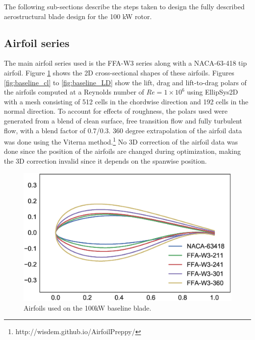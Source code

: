 The following sub-sections describe the steps taken to design the fully described aerostructural blade design for the 100 kW rotor.

\subsection{Airfoil series}

The main airfoil series used is the FFA-W3 series along with a NACA-63-418 tip airfoil.
Figure \ref{fig:baseline_airfoils} shows the 2D cross-sectional shapes of these airfoils.
Figures \ref{fig:baseline_cl} to \ref{fig:baseline_LD} show the lift, drag and lift-to-drag polars of the airfoils computed at a Reynolds number of $Re=1\times10^6$ using EllipSys2D with a mesh consisting of 512 cells in the chordwise direction and 192 cells in the normal direction.
To account for effects of roughness, the polars used were generated from a blend of clean surface, free transition flow and fully turbulent flow, with a blend factor of 0.7/0.3.
360 degree extrapolation of the airfoil data was done using the Viterna method.\footnote{http://wisdem.github.io/AirfoilPreppy/} No 3D correction of the airfoil data was done since the position of the airfoils are changed during optimization, making the 3D correction invalid since it depends on the spanwise position.

\begin{figure}[!ht]
\begin{center}
	\includegraphics[width=0.8\linewidth]{figures/KB_airfoil_series.eps}
\end{center}
\caption{Airfoils used on the 100kW baseline blade.}
\label{fig:baseline_airfoils}
\end{figure}

